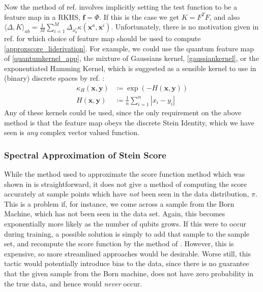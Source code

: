 Now the method of ref. involves implicitly setting the test function to be a feature map in a RKHS, $\mathbf{f} = \Phi$. If this is the case we get $K = F^TF$, and also $\langle \Delta, K\rangle_{ab} = \frac{1}{M}\sum_{i=1}^M \Delta_{x^i_b}\kappa(\mathbf{x}^a, \mathbf{x}^i)$. Unfortunately, there is no motivation given in ref. for which choice of feature map should be used to compute \eqref{approxscore_liderivation}. For example, we could use the quantum feature map  of \eqref{quantumkernel_app}, the mixture of Gaussians kernel, \eqref{gaussiankernel}, or the exponentiated Hamming Kernel, which is suggested as a sensible kernel to use in (binary) discrete spaces by ref. :
\begin{align}
    \kappa_H(\mathbf{x}, \mathbf{y}) & \coloneqq \exp\left(-H(\mathbf{x}, \mathbf{y})\right)\\
    H(\mathbf{x}, \mathbf{y}) & \coloneqq \frac{1}{n} \sum\limits_{i=1}^n|x_i - y_i| \label{hammingkernel}
\end{align}
Any of these kernels could be used, since the only requirement on the above method is that the feature map obeys the discrete Stein Identity, which we have seen is \textit{any} complex vector valued function.



\subsubsection{Spectral Approximation of Stein Score\label{supp_matt:spectralsteinscore}
}
While the method used to approximate the score function method which was shown in  is straightforward, it does not give a method of computing the score accurately at sample points which have \textit{not} been seen in the data distribution, $\pi$. This is a problem if, for instance, we come across a sample from the Born Machine, which has not been seen in the data set. Again, this becomes exponentially more likely as the number of qubits grows. If this were to occur during training, a possible solution is simply to add that sample to the sample set, and recompute the score function by the method of . However, this is expensive, so more streamlined approaches would be desirable. Worse still, this tactic would potentially introduce bias to the data, since there is no guarantee that the given sample from the Born machine, does not have zero probability in the true data, and hence would \textit{never} occur. 

